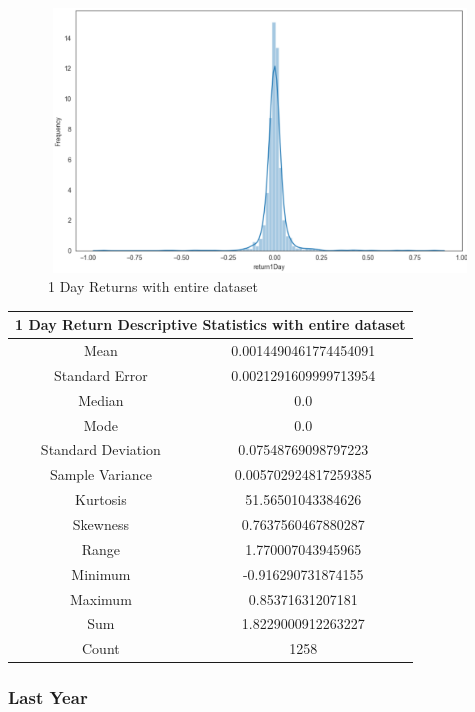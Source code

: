 \begin{figure}[h!]
\centering
\includegraphics[width=15cm,height=7cm,keepaspectratio]{resultsEvaluation/1returnDescMax.png}
\caption{1 Day Returns with entire dataset}
\label{fig:appendix_1returnDescMax}
\end{figure}
\begin{center}
\begin{tabular}{ c c }
\hline
\multicolumn{2}{|c|}{1 Day Return Descriptive Statistics with entire dataset} \\
\hline
Mean & 0.0014490461774454091 \\
Standard Error & 0.0021291609999713954 \\
Median & 0.0 \\
Mode & 0.0 \\
Standard Deviation & 0.07548769098797223 \\
Sample Variance & 0.005702924817259385 \\
Kurtosis & 51.56501043384626 \\
Skewness & 0.7637560467880287 \\
Range & 1.770007043945965 \\
Minimum & -0.916290731874155 \\
Maximum & 0.85371631207181 \\
Sum & 1.8229000912263227 \\
Count & 1258
\end{tabular}
\end{center}

\subsubsection{Last Year}

